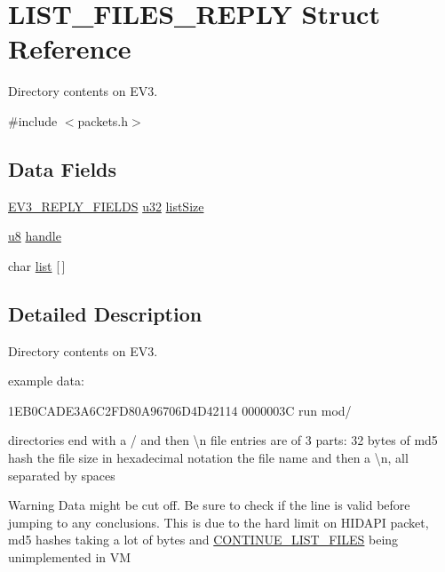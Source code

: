 \hypertarget{struct_l_i_s_t___f_i_l_e_s___r_e_p_l_y}{}\section{L\+I\+S\+T\+\_\+\+F\+I\+L\+E\+S\+\_\+\+R\+E\+P\+L\+Y Struct Reference}
\label{struct_l_i_s_t___f_i_l_e_s___r_e_p_l_y}


Directory contents on E\+V3.  




{\ttfamily \#include $<$packets.\+h$>$}

\subsection*{Data Fields}
\begin{DoxyCompactItemize}
\item 
\hyperlink{packets_8h_a382c165d520d462ac8f0c88e2a1970cb}{E\+V3\+\_\+\+R\+E\+P\+L\+Y\+\_\+\+F\+I\+E\+L\+D\+S} \hyperlink{defs_8h_afaa62991928fb9fb18ff0db62a040aba}{u32} \hyperlink{struct_l_i_s_t___f_i_l_e_s___r_e_p_l_y_a5a4efbe028da0ce77ddfd353ff9dacef}{list\+Size}
\item 
\hyperlink{defs_8h_a92c50087ca0e64fa93fc59402c55f8ca}{u8} \hyperlink{struct_l_i_s_t___f_i_l_e_s___r_e_p_l_y_aecb23f809384319c09f5c91846a0a49e}{handle}
\item 
char \hyperlink{struct_l_i_s_t___f_i_l_e_s___r_e_p_l_y_aff445b895fa0846e460f0c83e186647d}{list} \mbox{[}$\,$\mbox{]}
\end{DoxyCompactItemize}


\subsection{Detailed Description}
Directory contents on E\+V3. 

example data\+: 
\begin{DoxyPre}1EB0CADE3A6C2FD80A96706D4D42114 0000003C run
mod/\end{DoxyPre}


directories end with a / and then \textbackslash{}n file entries are of 3 parts\+: 32 bytes of md5 hash the file size in hexadecimal notation the file name and then a \textbackslash{}n, all separated by spaces \begin{DoxyWarning}{Warning}
Data might be cut off. Be sure to check if the line is valid before jumping to any conclusions. This is due to the hard limit on H\+I\+D\+A\+P\+I packet, md5 hashes taking a lot of bytes and \hyperlink{struct_c_o_n_t_i_n_u_e___l_i_s_t___f_i_l_e_s}{C\+O\+N\+T\+I\+N\+U\+E\+\_\+\+L\+I\+S\+T\+\_\+\+F\+I\+L\+E\+S} being unimplemented in V\+M 
\end{DoxyWarning}


